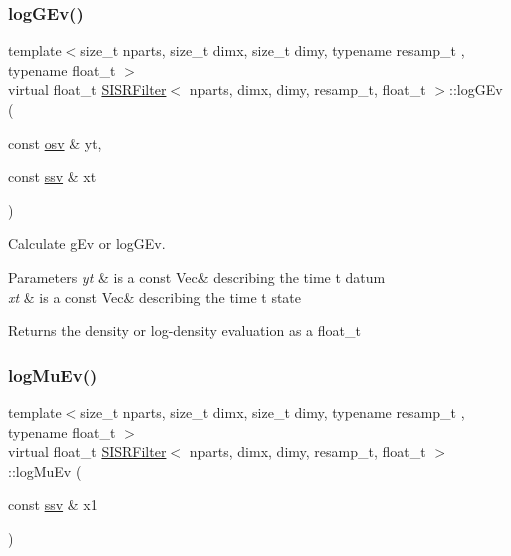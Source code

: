 \subsubsection{\texorpdfstring{log\+G\+Ev()}{logGEv()}}
{\footnotesize\ttfamily template$<$size\+\_\+t nparts, size\+\_\+t dimx, size\+\_\+t dimy, typename resamp\+\_\+t , typename float\+\_\+t $>$ \\
virtual float\+\_\+t \hyperlink{classSISRFilter}{S\+I\+S\+R\+Filter}$<$ nparts, dimx, dimy, resamp\+\_\+t, float\+\_\+t $>$\+::log\+G\+Ev (\begin{DoxyParamCaption}\item[{const \hyperlink{classSISRFilter_a5b762e9352857a9e48db3932191887ef}{osv} \&}]{yt,  }\item[{const \hyperlink{classSISRFilter_abfec45cf57ea6fadae4a9da8b0042351}{ssv} \&}]{xt }\end{DoxyParamCaption})\hspace{0.3cm}{\ttfamily [pure virtual]}}



Calculate g\+Ev or log\+G\+Ev. 


\begin{DoxyParams}{Parameters}
{\em yt} & is a const Vec\& describing the time t datum \\
\hline
{\em xt} & is a const Vec\& describing the time t state \\
\hline
\end{DoxyParams}
\begin{DoxyReturn}{Returns}
the density or log-\/density evaluation as a float\+\_\+t 
\end{DoxyReturn}
\mbox{\label{classSISRFilter_aff620e2208b6b26bbe109ce05520c5f8}} 
\subsubsection{\texorpdfstring{log\+Mu\+Ev()}{logMuEv()}}
{\footnotesize\ttfamily template$<$size\+\_\+t nparts, size\+\_\+t dimx, size\+\_\+t dimy, typename resamp\+\_\+t , typename float\+\_\+t $>$ \\
virtual float\+\_\+t \hyperlink{classSISRFilter}{S\+I\+S\+R\+Filter}$<$ nparts, dimx, dimy, resamp\+\_\+t, float\+\_\+t $>$\+::log\+Mu\+Ev (\begin{DoxyParamCaption}\item[{const \hyperlink{classSISRFilter_abfec45cf57ea6fadae4a9da8b0042351}{ssv} \&}]{x1 }\end{DoxyParamCaption})\hspace{0.3cm}{\ttfamily [pure virtual]}}



